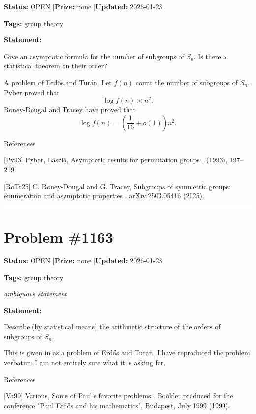 \documentclass{article}
\begin{document}
\noindent\textbf{Status:} OPEN \quad|\quad \textbf{Prize:} none \quad|\quad \textbf{Updated:} 2026-01-23

\noindent\textbf{Tags:} group theory

\medskip

\noindent\textbf{Statement:}

Give an asymptotic formula for the number of subgroups of $S_n$. Is there a statistical theorem on their order?




A problem of Erd\H{o}s and Tur\'{a}n. Let $f(n)$ count the number of subgroups of $S_n$. Pyber \cite{Py93} proved that\[\log f(n) \asymp n^2.\]Roney-Dougal and Tracey \cite{RoTr25} have proved that\[\log f(n)=\left(\frac{1}{16}+o(1)\right)n^2.\]




References

[Py93] Pyber, L\'{a}szl\'o, Asymptotic results for permutation groups . (1993), 197--219.

[RoTr25] C. Roney-Dougal and G. Tracey, Subgroups of symmetric groups: enumeration and asymptotic properties . arXiv:2503.05416 (2025).

\noindent\rule{\linewidth}{0.4pt}


\section{Problem \#1163}
\label{prob:1163}

\noindent\textbf{Status:} OPEN \quad|\quad \textbf{Prize:} none \quad|\quad \textbf{Updated:} 2026-01-23

\noindent\textbf{Tags:} group theory

\medskip
\noindent\textit{ambiguous statement}


\noindent\textbf{Statement:}

Describe (by statistical means) the arithmetic structure of the orders of subgroups of $S_n$.




This is given in \cite{Va99} as a problem of Erd\H{o}s and Tur\'{a}n. I have reproduced the problem verbatim; I am not entirely sure what it is asking for.




References

[Va99] Various, Some of Paul's favorite problems . Booklet produced for the conference "Paul Erd\H{o}s and his mathematics", Budapest, July 1999 (1999).
\end{document}
